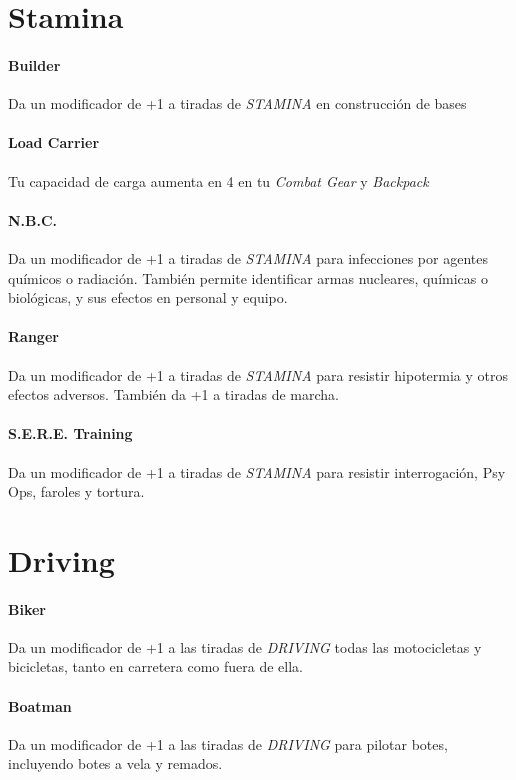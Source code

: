 \section{Stamina}

    \paragraph{Builder}
    Da un modificador de +1 a tiradas de \emph{STAMINA} en construcción de bases

    \paragraph{Load Carrier}
    Tu capacidad de carga aumenta en 4 en tu \emph{Combat Gear} y \emph{Backpack}

    \paragraph{N.B.C.}
    Da un modificador de +1 a tiradas de \emph{STAMINA} para infecciones por agentes químicos o radiación.
    También permite identificar armas nucleares, químicas o biológicas, y sus efectos en personal y equipo.

    \paragraph{Ranger}
    Da un modificador de +1 a tiradas de \emph{STAMINA} para resistir hipotermia y otros efectos adversos. 
    También da +1 a tiradas de marcha.

    \paragraph{S.E.R.E. Training}
    Da un modificador de +1 a tiradas de \emph{STAMINA} para resistir interrogación, Psy Ops, faroles y tortura.

\section{Driving}

    \paragraph{Biker}
    Da un modificador de +1 a las tiradas de \emph{DRIVING} todas las motocicletas y bicicletas, 
    tanto en carretera como fuera de ella.

    \paragraph{Boatman}
    Da un modificador de +1 a las tiradas de \emph{DRIVING} para pilotar botes, incluyendo botes a vela y remados.

